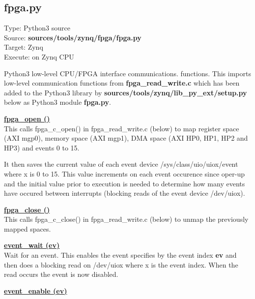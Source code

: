         \subsection{fpga.py}\label{ch:tools_python_zynq}

            Type: Python3 source\\        
            Source: {\bf sources/tools/zynq/fpga/fpga.py}\\
            Target: Zynq\\
            Execute: on Zynq CPU

            Python3 low-level CPU/FPGA interface communications. functions. This
            imports low-level communication functions from {\bf fpga\_read\_write.c}
            which has been added to the Python3 library by {\bf
            sources/tools/zynq/lib\_py\_ext/setup.py} below as Python3 module {\bf
            fpga.py}.

            \underline{{\bf fpga\_open ()}} \\

                This calls fpga\_c\_open() in fpga\_read\_write.c (below) to map register space
                (AXI mgp0), memory space (AXI mgp1), DMA space (AXI HP0, HP1, HP2 and HP3) and
                events 0 to 15.

                It then saves the current value of each event device /sys/class/uio/uiox/event where x is 0 to
                15. This value increments on each event occurence since oper-up and the initial value prior to
                execution is needed to determine how many events have occured between interrupts (blocking reads
                of the event device /dev/uiox).

            \underline{{\bf fpga\_close ()}} \\

                This calls fpga\_c\_close() in fpga\_read\_write.c (below) to unmap
                the previously mapped spaces.

            \underline{{\bf event\_wait (ev)}} \\

                Wait for an event. This enables the event specifies by the event index {\bf ev}
                and then does a blocking read on /dev/uiox where x is the event index. When
                the read occurs the event is now disabled.

            \underline{{\bf event\_enable (ev)}} \\

